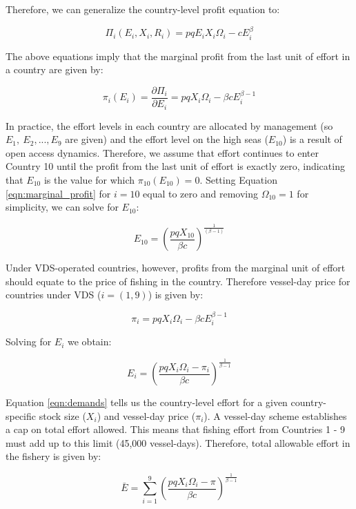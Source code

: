 \documentclass[12pt]{article}
\begin{document}
Therefore, we can generalize the country-level profit equation to:

$$
\Pi_i(E_i,X_i, R_i) = pqE_iX_i\Omega_i-cE_i^\beta
$$

\noindent The above equations imply that the marginal profit from the last unit of effort in a country are given by:

\begin{equation}
\pi_i(E_i) = \frac{\partial \Pi_i}{\partial E_i} = pqX_i\Omega_i - \beta cE_i^{\beta-1}
\label{eqn:marginal_profit}
\end{equation}

In practice, the effort levels in each country are allocated by management (so $E_{1},\ E_{2},...,E_{9}$ are given) and the effort level on the high seas ($E_{10}$) is a result of open access dynamics. Therefore, we assume that effort continues to enter Country 10 until the profit from the last unit of effort is exactly zero, indicating that $E_{10}$ is the value for which $\pi_{10}(E_{10})  = 0$. Setting Equation \ref{eqn:marginal_profit} for $i = 10$ equal to zero and removing $\Omega_{10} = 1$ for simplicity, we can solve for $E_{10}$:

\begin{equation}
E_{10} = \left(\frac{pqX_{10}}{\beta c}\right)^{\frac{1}{(\beta - 1)}}
\label{eqn:effort_hs}
\end{equation}

Under VDS-operated countries, however, profits from the marginal unit of effort should equate to the price of fishing in the country. Therefore vessel-day price for countries under VDS ($i = (1, 9)$) is  given by:

$$
\pi_i = pqX_i\Omega_i - \beta c E_i ^{\beta - 1}
$$

\noindent Solving for $E_i$ we obtain:

\begin{equation}
E_i = \left(\frac{pqX_i\Omega_i - \pi_i}{\beta c }\right) ^ {\frac{1}{\beta - 1}}
\label{eqn:demands}
\end{equation}

Equation \ref{eqn:demands} tells us the country-level effort for a given country-specific stock size ($X_i$) and vessel-day price ($\pi_i$). A vessel-day scheme establishes a cap on total effort allowed. This means that fishing effort from Countries 1 - 9 must add up to this limit (45,000 vessel-days). Therefore, total allowable effort in the fishery is given by:

\begin{equation}
\bar{E} = \sum_{i = 1}^9\left(\frac{pqX_i\Omega_i - \pi}{\beta c }\right) ^ {\frac{1}{\beta - 1}}
\label{eqn:Ebar}
\end{equation}
\end{document}
